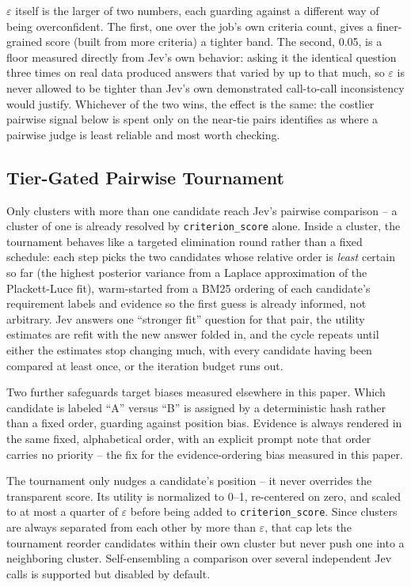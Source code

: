 \documentclass[journal]{IEEEtran}
\begin{document}
$\varepsilon$ itself is the larger of two numbers, each guarding against a different way of being overconfident. The first, one over the job's own criteria count, gives a finer-grained score (built from more criteria) a tighter band. The second, 0.05, is a floor measured directly from Jev's own behavior: asking it the identical question three times on real data produced answers that varied by up to that much, so $\varepsilon$ is never allowed to be tighter than Jev's own demonstrated call-to-call inconsistency would justify. Whichever of the two wins, the effect is the same: the costlier pairwise signal below is spent only on the near-tie pairs \cite{ref9} identifies as where a pairwise judge is least reliable and most worth checking.

\subsection{Tier-Gated Pairwise Tournament}
Only clusters with more than one candidate reach Jev's pairwise comparison -- a cluster of one is already resolved by \texttt{criterion\_score} alone. Inside a cluster, the tournament behaves like a targeted elimination round rather than a fixed schedule: each step picks the two candidates whose relative order is \emph{least} certain so far (the highest posterior variance from a Laplace approximation of the Plackett-Luce fit), warm-started from a BM25 ordering of each candidate's requirement labels and evidence so the first guess is already informed, not arbitrary. Jev answers one ``stronger fit'' question for that pair, the utility estimates are refit with the new answer folded in, and the cycle repeats until either the estimates stop changing much, with every candidate having been compared at least once, or the iteration budget runs out.

Two further safeguards target biases measured elsewhere in this paper. Which candidate is labeled ``A'' versus ``B'' is assigned by a deterministic hash rather than a fixed order, guarding against position bias. Evidence is always rendered in the same fixed, alphabetical order, with an explicit prompt note that order carries no priority -- the fix for the evidence-ordering bias measured in this paper.

The tournament only nudges a candidate's position -- it never overrides the transparent score. Its utility is normalized to 0--1, re-centered on zero, and scaled to at most a quarter of $\varepsilon$ before being added to \texttt{criterion\_score}. Since clusters are always separated from each other by more than $\varepsilon$, that cap lets the tournament reorder candidates within their own cluster but never push one into a neighboring cluster. Self-ensembling a comparison over several independent Jev calls is supported but disabled by default.
\end{document}
